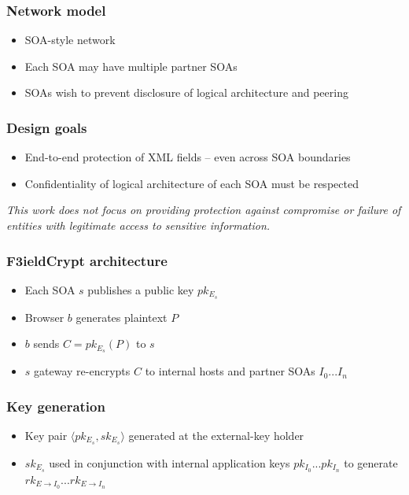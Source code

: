 \documentclass{beamer}
\begin{document}
\begin{frame}
\frametitle{Network model}
\begin{itemize}
\item SOA-style network
\item Each SOA may have multiple partner SOAs
\item SOAs wish to prevent disclosure of logical architecture and peering 
\end{itemize}
\end{frame}


\begin{frame}
\frametitle{Design goals}
\begin{itemize}
\item End-to-end protection of XML fields -- even across SOA boundaries
\item Confidentiality of logical architecture of each SOA must be respected
\end{itemize}
\medskip
\small{\emph{This work does not focus on providing protection against
compromise or failure of entities with legitimate access to sensitive
information.}}
\end{frame}

\begin{frame}
\frametitle{F3ieldCrypt architecture}
\begin{itemize}
\item Each SOA $s$ publishes a public key $pk_{E_s}$
\item Browser $b$ generates plaintext $P$
\item $b$ sends $C = pk_{E_s}(P)$ to $s$
\item $s$ gateway re-encrypts $C$ to internal hosts and partner SOAs
$I_0...I_n$ 
\end{itemize}
\end{frame}

\begin{frame}
\frametitle{Key generation}
\begin{itemize}
\item Key pair $\langle pk_{E_s}, sk_{E_s} \rangle$ generated at the
\alert{external-key holder}
\item $sk_{E_s}$ used in conjunction with internal application keys
$pk_{I_0}...pk_{I_n}$ to generate $rk_{E \to I_0}...rk_{E \to I_n}$
\end{itemize}
\end{frame}
\end{document}
